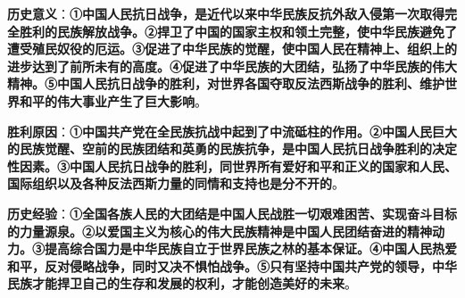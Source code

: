 \textbf{{历史意义}}：\textbf{{①}中国人民抗日战争，是近代以来中华民族反抗外敌入侵第一次取得完全胜利的民族解放战争。{②}捍卫了中国的国家主权和领土完整，使中华民族避免了遭受殖民奴役的厄运。{③}促进了中华民族的觉醒，使中国人民在精神上、组织上的进步达到了前所未有的高度。{④}促进了中华民族的大团结，弘扬了中华民族的伟大精神。{⑤}中国人民抗日战争的胜利，对世界各国夺取反法西斯战争的胜利、维护世界和平的伟大事业产生了巨大影响}。

\textbf{{胜利原因}}{：}\textbf{①中国共产党在全民族抗战中起到了中流砥柱的作用。②中国人民巨大的民族觉醒、空前的民族团结和英勇的民族抗争，是中国人民抗日战争胜利的决定性因素。③中国人民抗日战争的胜利，同世界所有爱好和平和正义的国家和人民、国际组织以及各种反法西斯力量的同情和支持也是分不开的}{。}

\textbf{{历史经验}}{：}\textbf{①全国各族人民的大团结是中国人民战胜一切艰难困苦、实现奋斗目标的力量源泉。②以爱国主义为核心的伟大民族精神是中国人民团结奋进的精神动力。③提高综合国力是中华民族自立于世界民族之林的基本保证。④中国人民热爱和平，反对侵略战争，同时又决不惧怕战争。⑤只有坚持中国共产党的领导，中华民族才能捍卫自己的生存和发展的权利，才能创造美好的未来}{。}
